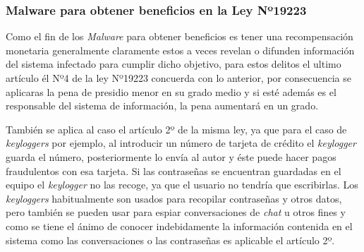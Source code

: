 \subsubsection{Malware para obtener beneficios en la Ley Nº19223}
Como el fin de los \textit{Malware} para obtener beneficios es tener una recompensación monetaria generalmente claramente estos a veces revelan o difunden información del sistema infectado para cumplir dicho objetivo, para estos delitos el ultimo artículo él Nº4 de la ley Nº19223 concuerda con lo anterior, por consecuencia se aplicaras la pena de presidio menor en su grado medio y si esté además es el responsable del sistema de información, la pena aumentará en un grado.

También se aplica al caso el artículo 2º de la misma ley, ya que para el caso de \textit{keyloggers} por ejemplo, al introducir un número de tarjeta de crédito el \textit{keylogger} guarda el número, posteriormente lo envía al autor y éste puede hacer pagos fraudulentos con esa tarjeta. Si las contraseñas se encuentran guardadas en el equipo el \textit{keylogger} no las recoge, ya que el usuario no tendría que escribirlas. Los \textit{keyloggers} habitualmente son usados para recopilar contraseñas y otros datos, pero también se pueden usar para espiar conversaciones de \textit{chat} u otros fines y como se tiene el ánimo de conocer indebidamente la información contenida en el sistema como las conversaciones o las contraseñas es aplicable el artículo 2º.